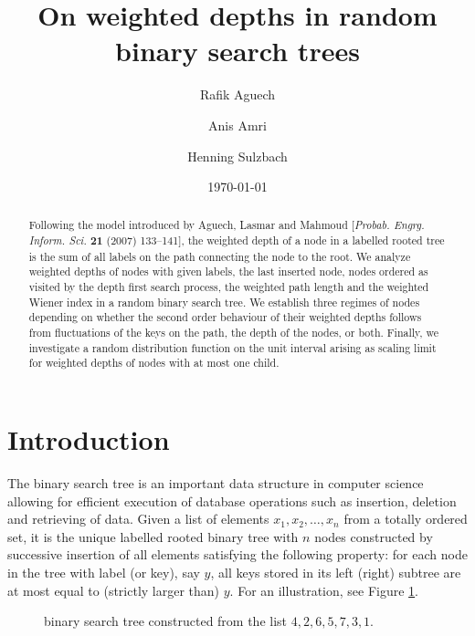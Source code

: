 \documentclass{amsart}       %
\author{Rafik Aguech}
\author{Anis Amri}
\author{Henning Sulzbach}
\title{On weighted depths  in random binary search trees}
\begin{document}
\begin{abstract}
Following the model introduced by Aguech, Lasmar and Mahmoud [\emph{Probab. Engrg. Inform. Sci.} \textbf{21} (2007) 133--141], the weighted depth of a node in a labelled rooted tree is the sum of all labels on the path connecting the node to the root. We analyze weighted depths  of nodes with given labels, the last inserted node, nodes ordered as visited by the depth first search process, the weighted path length and the weighted Wiener index in a random binary search tree. We establish three regimes of nodes depending on whether the second order behaviour of their weighted depths follows from fluctuations of the keys on the path, the depth of the nodes, or both.  Finally, we investigate a random distribution function on the unit interval arising as scaling limit for weighted depths of nodes with at most one child.
\end{abstract}


\date{\today}
\maketitle



\section{Introduction}
\label{intro}
The binary search tree is an important data structure in computer science allowing for efficient execution of database operations such as insertion, deletion and retrieving of data. Given a list of elements $x_1, x_2, \ldots, x_n$ from a totally ordered set, 
it is the unique labelled rooted binary tree with $n$ nodes constructed by successive insertion of all elements  satisfying the following property: for each node in the tree with label (or key), say $y$, all keys stored in its left (right) subtree are at most equal to (strictly larger than) $y$.
For an illustration, see Figure \ref{fig_ex}.
\begin{figure} [htb] \label{fig_ex}
\centering
{}
\caption{binary search tree constructed from the list $4, 2, 6, 5, 7, 3,  1$.}
\end{figure}
\end{document}
